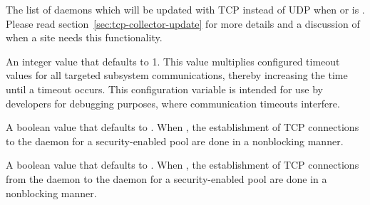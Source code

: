 \begin{description}
\label{param:TcpUpdateCollectors}
\item[\Macro{TCP\_UPDATE\_COLLECTORS}]
  The list of  daemons which will be updated with 
  TCP instead of UDP
  when  or
   is .
  Please read section~\ref{sec:tcp-collector-update} 
  for more details and a discussion of when a site needs this functionality. 

\label{param:SubsysTimeoutMultiplier}
\item[\MacroB{<SUBSYS>\_TIMEOUT\_MULTIPLIER}]
  An integer value that defaults to 1.
  This value multiplies configured timeout values
  for all targeted subsystem communications,
  thereby increasing the time until a timeout occurs.
  This configuration variable is intended for use by developers for
  debugging purposes, where communication timeouts interfere.

\label{param:NonblockingCollectorUpdate}
\item[\Macro{NONBLOCKING\_COLLECTOR\_UPDATE}]
  A boolean value that defaults to .
  When , the establishment of TCP connections
  to the  daemon
  for a security-enabled pool are done in a nonblocking manner.

\label{param:NegotiatorUseNonblockingStartdContact}
\item[\Macro{NEGOTIATOR\_USE\_NONBLOCKING\_STARTD\_CONTACT}]
  A boolean value that defaults to .
  When , the establishment of TCP connections
  from the  daemon to the  daemon
  for a security-enabled pool are done in a nonblocking manner.


\end{description}

